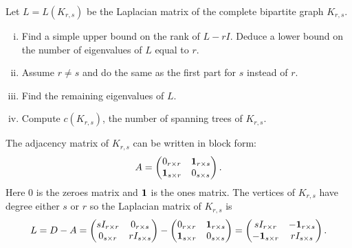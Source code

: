 \documentclass[12pt]{memoir}
\begin{document}
\begin{Ej}
    Let $L=L(K_{r,s})$ be the Laplacian matrix of the complete bipartite graph $K_{r,s}$.
    \begin{enumerate}[i)]
        \itemsep=-0.4em
        \item Find a simple upper bound on the rank of $L-rI$. Deduce a lower bound on the number of eigenvalues of $L$ equal to $r$.
        \item Assume $r\neq s$ and do the same as the first part for $s$ instead of $r$.
        \item Find the remaining eigenvalues of $L$.
        \item Compute $c(K_{r,s})$, the number of spanning trees of $K_{r,s}$.
    \end{enumerate}
\end{Ej}

\begin{ptcbr}
    The adjacency matrix of $K_{r,s}$ can be written in block form:
    $$A=\begin{pmatrix} 0_{r\times r} & \mathbf{1}_{r\times s} \\ \mathbf{1}_{s\times r} & 0_{s\times s} \end{pmatrix}.$$
    Here $0$ is the zeroes matrix and $\mathbf{1}$ is the ones matrix. The vertices of $K_{r,s}$ have degree either $s$ or $r$ so the Laplacian matrix of $K_{r,s}$ is
    $$L=D-A=\begin{pmatrix} sI_{r\times r} & 0_{r\times s} \\ 0_{s\times r} & rI_{s\times s} \end{pmatrix}-\begin{pmatrix} 0_{r\times r} & \mathbf{1}_{r\times s} \\ \mathbf{1}_{s\times r} & 0_{s\times s} \end{pmatrix}=\begin{pmatrix} sI_{r\times r} & -\mathbf{1}_{r\times s} \\ -\mathbf{1}_{s\times r} & rI_{s\times s} \end{pmatrix}.$$
\end{ptcbr}
\end{document}
